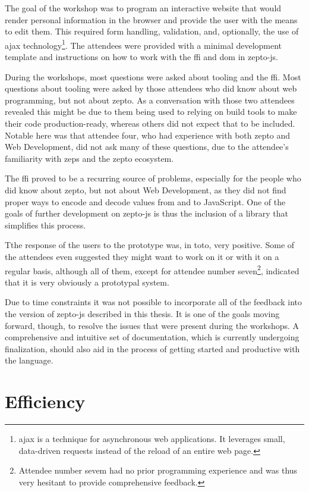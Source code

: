 \documentclass[oneside,11pt,xetex]{scrbook}
\begin{document}
The goal of the workshop was to program an interactive website that would
render personal information in the browser and provide the user with the means
to edit them. This required form handling, validation, and, optionally, the
use of \gls{ajax} technology\footnote{\gls{ajax} is a technique for asynchronous
web applications. It leverages small, data-driven requests instead of the reload
of an entire web page.}. The attendees were provided with a minimal development
template and instructions on how to work with the \gls{ffi} and \gls{dom} in zepto-js.

During the workshops, most questions were asked about tooling and the \gls{ffi}.
Most questions about tooling were asked by those attendees who did know about
web programming, but not about zepto. As a conversation with those two attendees
revealed this might be due to them being used to relying on build tools to make
their code production-ready, whereas others did not expect that to be included.
Notable here was that attendee four, who had experience with both zepto and Web
Development, did not ask many of these questions, due to the attendee's familiarity
with \gls{zeps} and the zepto ecosystem.

The \gls{ffi} proved to be a recurring source of problems, especially for the
people who did know about zepto, but not about Web Development, as they did not
find proper ways to encode and decode values from and to JavaScript. One of the
goals of further development on zepto-js is thus the inclusion of a library that
simplifies this process.

Tthe response of the users to the prototype was, in toto, very positive. Some
of the attendees even suggested they might want to work on it or with it on
a regular basis, although all of them, except for attendee number seven\footnote{Attendee
number sevem had no prior programming experience and was thus very hesitant to
provide comprehensive feedback.}, indicated that it is very obviously a prototypal
system.

Due to time constraints it was not possible to incorporate all of the feedback into
the version of zepto-js described in this thesis. It is one of the goals moving forward,
though, to resolve the issues that were present during the workshops. A comprehensive
and intuitive set of documentation, which is currently undergoing finalization, should
also aid in the process of getting started and productive with the language.

\section{Efficiency}
\end{document}
